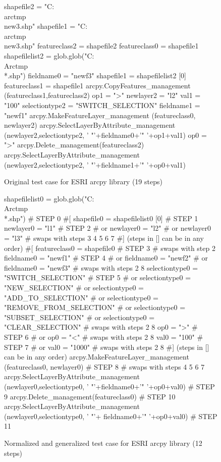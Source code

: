 \begin{figure}
{\scriptsize 
\begin{code}
shapefile2 = "C:\\arctmp\\new3.shp" 
shapefile1 = "C:\\arctmp\\new3.shp" 
featureclass2 = shapefile2 
featureclass0 = shapefile1 
shapefilelist2 = 
   glob.glob("C:\\Arctmp\\*.shp") 
fieldname0 = "newf3" 
shapefile1 = shapefilelist2 [0] 
featureclass1 = shapefile1 
arcpy.CopyFeatures\_management
   (featureclass1,featureclass2) 
op1 = ">" 
newlayer2 = "l2" 
val1 = "100" 
selectiontype2 = "SWITCH\_SELECTION" 
fieldname1 = "newf1" 
arcpy.MakeFeatureLayer\_management
   (featureclass0, newlayer2) 
arcpy.SelectLayerByAttribute\_management
   (newlayer2,selectiontype2,
   ' "'+fieldname0+'" '+op1+val1) 
op0 = ">" 
arcpy.Delete\_management(featureclass2) 
arcpy.SelectLayerByAttribute\_management
   (newlayer2,selectiontype2,
   ' "'+fieldname1+'" '+op0+val1) 
\end{code}
}
\caption{Original test case for ESRI arcpy library (19 steps)}
\end{figure}

\begin{figure}
{\scriptsize 
\begin{code}
shapefilelist0 = 
   glob.glob("C:\\Arctmp\\*.shp")        \# STEP 0
\#[
shapefile0 = shapefilelist0 [0]        \# STEP 1
newlayer0 = "l1"                       \# STEP 2
\#  or newlayer0 = "l2" 
\#  or newlayer0 = "l3" 
\#  swaps with steps 3 4 5 6 7
\#] (steps in [] can be in any order)
\#[
featureclass0 = shapefile0             \# STEP 3
\#  swaps with step 2
fieldname0 = "newf1"                   \# STEP 4
\#  or fieldname0 = "newf2" 
\#  or fieldname0 = "newf3" 
\#  swaps with steps 2 8
selectiontype0 = "SWITCH\_SELECTION"    \# STEP 5
\#  or selectiontype0 = "NEW\_SELECTION" 
\#  or selectiontype0 = "ADD\_TO\_SELECTION" 
\#  or selectiontype0 = "REMOVE\_FROM\_SELECTION"
\#  or selectiontype0 = "SUBSET\_SELECTION"
\#  or selectiontype0 = "CLEAR\_SELECTION"   
\#  swaps with steps 2 8
op0 = ">"                              \# STEP 6
\#  or op0 = "<" 
\#  swaps with steps 2 8
val0 = "100"                           \# STEP 7
\#  or val0 = "1000" 
\#  swaps with steps 2 8
\#] (steps in [] can be in any order)
arcpy.MakeFeatureLayer\_management
   (featureclass0, newlayer0)          \# STEP 8
\#  swaps with steps 4 5 6 7
arcpy.SelectLayerByAttribute\_management
   (newlayer0,selectiontype0,
   ' "'+fieldname0+'" '+op0+val0)      \# STEP 9
arcpy.Delete\_management(featureclass0) \# STEP 10
arcpy.SelectLayerByAttribute\_management
   (newlayer0,selectiontype0,
   ' "'+ fieldname0+'" '+op0+val0)     \# STEP 11
\end{code}
}
\caption{Normalized and generalized test case for ESRI arcpy library
  (12 steps)}
\end{figure}